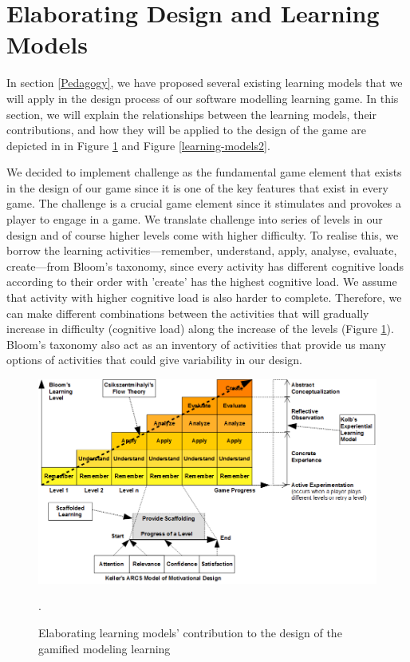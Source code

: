 \documentclass[12pt, a4paper]{report}
\begin{document}
\section{Elaborating Design and Learning Models}
\label{Elaborating Design and Learning Models}
In section \ref{Pedagogy}, we have proposed several existing learning models that we will apply in the design process of our software modelling learning game. In this section, we will explain the relationships between the learning models, their contributions, and how they will be applied to the design of the game are depicted in in Figure \ref{learning-models} and Figure \ref{learning-models2}.

We decided to implement challenge as the fundamental game element that exists in the design of our game since it is one of the key features that exist in every game. The challenge is a crucial game element since it stimulates and provokes a player to engage in a game. We translate challenge into series of levels in our design and of course higher levels come with higher difficulty. To realise this, we borrow the learning activities---remember, understand, apply, analyse, evaluate, create---from Bloom's taxonomy, since every activity has different cognitive loads according to their order with 'create' has the highest cognitive load. We assume that activity with higher cognitive load is also harder to complete. Therefore, we can make different combinations between the activities that will gradually increase in difficulty (cognitive load) along the increase of the levels (Figure \ref{learning-models}). Bloom's taxonomy also act as an inventory of activities that provide us many options of activities that could give variability in our design. 

\begin{figure}[ht]
\centering
\includegraphics[width=\textwidth]{learning-models}
\caption{Elaborating learning models' contribution to the design of the gamified modeling learning}.
\label{learning-models}
\end{figure}
\end{document}
